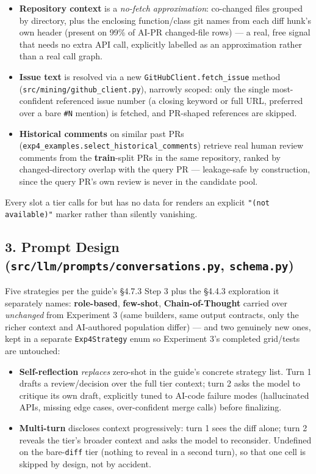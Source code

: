 \documentclass{experimentreport}
\begin{document}
{\begin{itemize}
\item \textbf{Repository context} is a \emph{no-fetch approximation}: co-changed files grouped by
directory, plus the enclosing function/class git names from each diff hunk's own header (present on
99\% of AI-PR changed-file rows) --- a real, free signal that needs no extra API call, explicitly
labelled as an approximation rather than a real call graph.
\item \textbf{Issue text} is resolved via a new \texttt{GitHubClient.fetch\_issue} method
(\texttt{src/mining/github\_client.py}), narrowly scoped: only the single most-confident referenced
issue number (a closing keyword or full URL, preferred over a bare \texttt{\#N} mention) is fetched,
and PR-shaped references are skipped.
\item \textbf{Historical comments} on similar past PRs (\texttt{exp4\_examples.select\_historical\_comments})
retrieve real human review comments from the \textbf{train}-split PRs in the same repository, ranked
by changed-directory overlap with the query PR --- leakage-safe by construction, since the query
PR's own review is never in the candidate pool.
\end{itemize}

Every slot a tier calls for but has no data for renders an explicit \texttt{"(not available)"}
marker rather than silently vanishing.

\subsection*{3. Prompt Design (\texttt{src/llm/prompts/conversations.py}, \texttt{schema.py})}

Five strategies per the guide's \S4.7.3 Step 3 plus the \S4.4.3 exploration it separately names:
\textbf{role-based}, \textbf{few-shot}, \textbf{Chain-of-Thought} carried over \emph{unchanged} from
Experiment 3 (same builders, same output contracts, only the richer context and AI-authored
population differ) --- and two genuinely new ones, kept in a separate \texttt{Exp4Strategy} enum so
Experiment 3's completed grid/tests are untouched:

\begin{itemize}
\item \textbf{Self-reflection} \emph{replaces} zero-shot in the guide's concrete strategy list. Turn
1 drafts a review/decision over the full tier context; turn 2 asks the model to critique its own
draft, explicitly tuned to AI-code failure modes (hallucinated APIs, missing edge cases,
over-confident merge calls) before finalizing.
\item \textbf{Multi-turn} discloses context progressively: turn 1 sees the diff alone; turn 2 reveals
the tier's broader context and asks the model to reconsider. Undefined on the bare-\texttt{diff}
tier (nothing to reveal in a second turn), so that one cell is skipped by design, not by accident.
\end{itemize}

}
\end{document}
